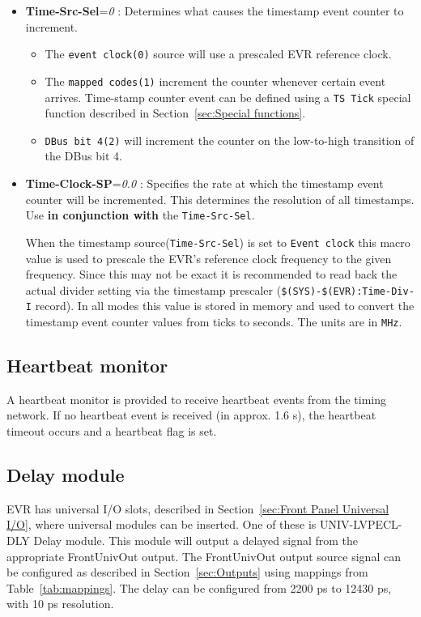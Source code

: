 \documentclass[12pt,a4paper]{article}
\begin{document}
\begin{itemize}
\item
	\textbf{Time-Src-Sel}=\emph{0} : Determines what causes the
timestamp event counter to increment.

\begin{itemize}
\item
  The \texttt{event clock(0)} source will use a prescaled EVR
  reference clock.
\item
  The \texttt{mapped codes(1)} increment the counter whenever
  certain event arrives. Time-stamp counter event can be defined using a \texttt{TS Tick} special function described in Section~\ref{sec:Special functions}.
\item
  \texttt{DBus bit 4(2)} will increment the counter on the
  low-to-high transition of the DBus bit 4.
\end{itemize}
\item
	\textbf{Time-Clock-SP}=\emph{0.0} : Specifies the rate at which the
timestamp event counter will be incremented. This determines the
resolution of all timestamps. Use \textbf{in conjunction with} the \texttt{Time-Src-Sel}.

When the timestamp source(\texttt{Time-Src-Sel}) is set to \texttt{Event clock}
this macro value is used to prescale the EVR's reference clock
frequency to the given frequency. Since this may not be exact it is
recommended to read back the actual divider setting via the
timestamp prescaler (\texttt{\$(SYS)-\$(EVR):Time-Div-I} record). In
all modes this value is stored in memory and used to convert the
timestamp event counter values from ticks to seconds. The units are
in \texttt{MHz}.
\end{itemize}

\subsection{Heartbeat monitor}\label{sec:Heartbeat monitor}
A heartbeat monitor is provided to receive heartbeat events from the timing network. If no heartbeat event is received (in approx. 1.6 s), the heartbeat timeout occurs and a heartbeat flag is set. 

\subsection{Delay module}\label{evr-delaymodule.template}
EVR has universal I/O slots, described in Section~\ref{sec:Front Panel Universal I/O}, where universal modules can be inserted. One of these is UNIV-LVPECL-DLY Delay module. This module will output a delayed signal from the appropriate FrontUnivOut output. The FrontUnivOut output source signal can be configured as described in Section~\ref{sec:Outputs} using mappings from Table~\ref{tab:mappings}. The delay can be configured from 2200 ps to 12430 ps, with 10 ps resolution. 
\end{document}
